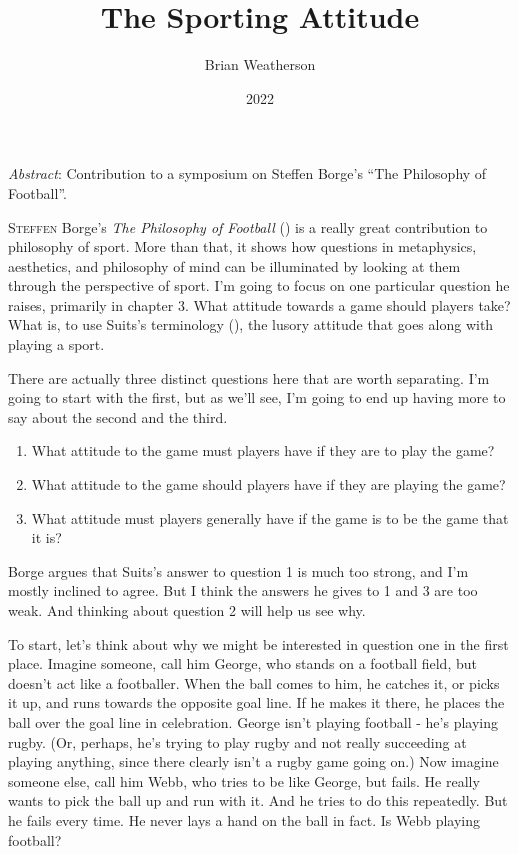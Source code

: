 \documentclass[
  11pt,
  letterpaper,
  DIV=11,
  numbers=noendperiod,
  twoside]{scrartcl}
\title{The Sporting Attitude}
\author{Brian Weatherson}
\date{2022}
\providecommand{\tightlist}{%
  \setlength{\itemsep}{0pt}\setlength{\parskip}{0pt}}
\renewenvironment{abstract}
 {\vspace{-1.25cm}
 \quotation\small\noindent\emph{Abstract}:}
 {\endquotation}
\renewenvironment{abstract}
 {\quotation\small\noindent\emph{Abstract}:}
 {\endquotation\vspace{-0.02cm}}
\begin{document}
\maketitle
\begin{abstract}
Contribution to a symposium on Steffen Borge's ``The Philosophy of
Football''.
\end{abstract}


\lettrine{S}{teffen} Borge's \emph{The Philosophy of Football}
() is a really great contribution to
philosophy of sport. More than that, it shows how questions in
metaphysics, aesthetics, and philosophy of mind can be illuminated by
looking at them through the perspective of sport. I'm going to focus on
one particular question he raises, primarily in chapter 3. What attitude
towards a game should players take? What is, to use Suits's terminology
(), the lusory attitude that goes
along with playing a sport.

There are actually three distinct questions here that are worth
separating. I'm going to start with the first, but as we'll see, I'm
going to end up having more to say about the second and the third.

\begin{enumerate}
\def\labelenumi{\arabic{enumi}.}
\tightlist
\item
  What attitude to the game must players have if they are to play the
  game?
\item
  What attitude to the game should players have if they are playing the
  game?
\item
  What attitude must players generally have if the game is to be the
  game that it is?
\end{enumerate}

Borge argues that Suits's answer to question 1 is much too strong, and
I'm mostly inclined to agree. But I think the answers he gives to 1 and
3 are too weak. And thinking about question 2 will help us see why.

To start, let's think about why we might be interested in question one
in the first place. Imagine someone, call him George, who stands on a
football field, but doesn't act like a footballer. When the ball comes
to him, he catches it, or picks it up, and runs towards the opposite
goal line. If he makes it there, he places the ball over the goal line
in celebration. George isn't playing football - he's playing rugby. (Or,
perhaps, he's trying to play rugby and not really succeeding at playing
anything, since there clearly isn't a rugby game going on.) Now imagine
someone else, call him Webb, who tries to be like George, but fails. He
really wants to pick the ball up and run with it. And he tries to do
this repeatedly. But he fails every time. He never lays a hand on the
ball in fact. Is Webb playing football?
\end{document}
